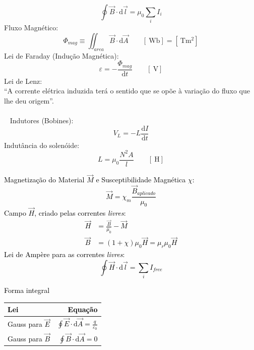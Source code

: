 \documentclass[a4paper,10pt]{extarticle} %
\newcommand{\mybox}[2]{
    \begin{tcolorbox}[colback=lightblue!5!white,colframe=lightblue!75!black,boxsep=1pt,arc=0pt,outer arc=0pt,title={\textcolor{black}{#1}}]
        \textcolor{black}{#2}
    \end{tcolorbox}
}
\begin{document}
\begin{multicols}{2}
{\begin{equation}
        \oint \vec{B} \cdot  \mathrm{d}\vec{l} = \mu_0 \sum_i I_i
    \end{equation}
     Fluxo Magnético:
    \begin{equation}
        \Phi_{mag} \equiv \iint_{area} \vec{B} \cdot \mathrm{d}\vec{A} \qquad  [\SI{}{\weber}]= [\SI{}{\tesla\meter\squared}]
    \end{equation}
    Lei de Faraday (Indução Magnética):
    \begin{equation}
        \varepsilon = -\frac{\Phi_{mag}}{\mathrm{d} t} \qquad [\SI{}{\volt}]
    \end{equation}
    Lei de Lenz:\\
    ``A corrente elétrica induzida terá o sentido que se opõe à variação do fluxo que lhe deu origem''.\\
    \\~
    Indutores (Bobines):
    \begin{equation}
        V_L = - L\frac{\mathrm{d} I}{\mathrm{d} t}
    \end{equation}
     Indutância do solenóide:
    \begin{equation}
        L = \mu_0 \frac{N^2 A}{l} \qquad [\SI{}{\henry}]
    \end{equation}
}
\mybox{Ferromagnetismo.}{
    Magnetização do Material $\vec{M}$ e Susceptibilidade Magnética $\chi$:
    \begin{equation}
        \vec{M} = \chi_m\frac{\vec{B}_{aplicado}}{\mu_0}
    \end{equation}
    Campo $\vec{H}$, criado pelas correntes \emph{livres}:
    \begin{align}
        \vec{H} &= \frac{\vec{B}}{\mu_0} - \vec{M}\\
        \vec{B} &= (1 + \chi) \mu_0 \vec{H} = \mu_r \mu_0 \vec{H}
    \end{align}
    Lei de Ampère para as correntes \emph{livres}:
    \begin{equation}
        \oint \vec{H} \cdot  \mathrm{d}\vec{l} = \sum_i I_{free}
    \end{equation}
}
%
\mybox{Equações (Leis) de Maxwell.}{
Forma integral
    \begin{tabular}{||l|r||}
        \hline  {\bf Lei} & {\bf Equação }\\
        \hline Gauss para \(\vec{E}\)  & \( \oint \vec{E}\cdot  \mathrm{d}\vec{A}  = \frac{q}{\varepsilon_0} \)\\
        \hline Gauss para \(\vec{B}\)  & \( \oint \vec{B}\cdot  \mathrm{d}\vec{A}  = 0 \)\\

\end{tabular}}
\end{multicols}
\end{document}

